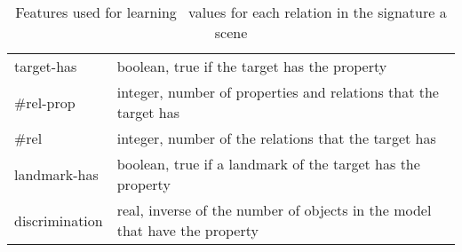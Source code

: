 \begin{small}
\begin{table}[h!]
\begin{center}
\begin{tabular}{|l|p{10cm}|} 
\hline
\small target-has     & \small boolean, true if the target has the property \\
\small \#rel-prop     & \small integer, number of properties and relations that the target has\\
\small \#rel          & \small integer, number of the relations that the target has \\
\small landmark-has   & \small boolean, true if a landmark of the target has the property\\
\small discrimination & \small real,  inverse of the number of objects in the model that have the property \\
\hline
\end{tabular}
\caption{Features used for learning \puse\ values for each relation in the signature a scene}\label{features}
\end{center}
\end{table}
\end{small}


